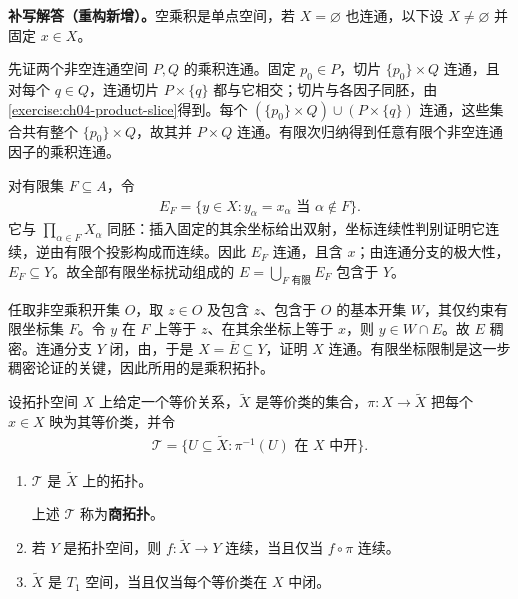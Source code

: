 \documentclass[../../main.tex]{subfiles}%
\begin{document}
\begin{solution}
\textbf{补写解答（重构新增）。}空乘积是单点空间，若 $X=\varnothing$ 也连通，以下设 $X\ne\varnothing$ 并固定 $x\in X$。

先证两个非空连通空间 $P,Q$ 的乘积连通。固定 $p_0\in P$，切片 $\{p_0\}\times Q$ 连通，且对每个 $q\in Q$，连通切片 $P\times\{q\}$ 都与它相交；切片与各因子同胚，由\cref{exercise:ch04-product-slice}得到。每个 $(\{p_0\}\times Q)\cup(P\times\{q\})$ 连通，这些集合共有整个 $\{p_0\}\times Q$，故其并 $P\times Q$ 连通。有限次归纳得到任意有限个非空连通因子的乘积连通。

对有限集 $F\subseteq A$，令
\begin{align*}
E_F=\{y\in X:y_\alpha=x_\alpha\text{ 当 }\alpha\notin F\}.
\end{align*}
它与 $\prod_{\alpha\in F}X_\alpha$ 同胚：插入固定的其余坐标给出双射，坐标连续性判别证明它连续，逆由有限个投影构成而连续。因此 $E_F$ 连通，且含 $x$；由连通分支的极大性，$E_F\subseteq Y$。故全部有限坐标扰动组成的 $E=\bigcup_{F\text{ 有限}}E_F$ 包含于 $Y$。

任取非空乘积开集 $O$，取 $z\in O$ 及包含 $z$、包含于 $O$ 的基本开集 $W$，其仅约束有限坐标集 $F$。令 $y$ 在 $F$ 上等于 $z$、在其余坐标上等于 $x$，则 $y\in W\cap E$。故 $E$ 稠密。连通分支 $Y$ 闭，由，于是 $X=\overline E\subseteq Y$，证明 $X$ 连通。有限坐标限制是这一步稠密论证的关键，因此所用的是乘积拓扑。
\end{solution}
\begin{exercise}\label{exercise:ch04-quotient-topology}
设拓扑空间 $X$ 上给定一个等价关系，$\widetilde X$ 是等价类的集合，$\pi:X\to\widetilde X$ 把每个 $x\in X$ 映为其等价类，并令
\begin{align*}
\mathcal T=\{U\subseteq\widetilde X:\pi^{-1}(U)\text{ 在 }X\text{ 中开}\}.
\end{align*}
\begin{enumerate}
\item\label{item:ch04-quotient-is-topology} $\mathcal T$ 是 $\widetilde X$ 上的拓扑。
\begin{definition*}[商拓扑]\label{definition:ch04-quotient-topology}
上述 $\mathcal T$ 称为\textbf{商拓扑}。
\end{definition*}
\item\label{item:ch04-quotient-continuity} 若 $Y$ 是拓扑空间，则 $f:\widetilde X\to Y$ 连续，当且仅当 $f\circ\pi$ 连续。
\item\label{item:ch04-quotient-t1} $\widetilde X$ 是 $T_1$ 空间，当且仅当每个等价类在 $X$ 中闭。
\end{enumerate}
\end{exercise}
\end{document}
